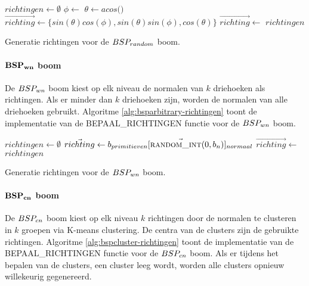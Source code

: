 \begin{dutchalgorithm}
    \begin{algorithmic}       
            \State $richtingen \gets \emptyset$
                    \State $\phi \gets $ 
                    \State $\theta \gets acos($$)$
                    \State $\vec{richting} \gets \{ sin(\theta)cos(\phi), sin(\theta)sin(\phi), cos(\theta) \}$
                    \State $\vec{richting} \gets $ 
                    \State {}
            \EndFor
            \State \Return $richtingen$
        \EndFunction
    \end{algorithmic}
    \caption{Generatie richtingen voor de $BSP_{random}$  boom.}
    \label{alg:bsprandom-richtingen}
\end{dutchalgorithm}

\paragraph{$\mathbf{BSP_{wn}}$ boom}
De $BSP_{wn}$ boom kiest op elk niveau de normalen van $k$ driehoeken als richtingen.
Als er minder dan $k$ driehoeken zijn, worden de normalen van alle driehoeken gebruikt.
Algoritme \ref{alg:bsparbitrary-richtingen} toont de implementatie van de BEPAAL\_RICHTINGEN functie voor de $BSP_{wn}$ boom.

\begin{dutchalgorithm}
    \begin{algorithmic}       
            \State $richtingen \gets \emptyset$
                    \State $\vec{richting} \gets \vec{b_{primitieven}[\Call{random\_int}{0, b_n}]_{normaal}}$
                    \State $\vec{richting} \gets $ 
                    \State {}
            \EndWhile
            \State \Return $richtingen$
        \EndFunction
    \end{algorithmic}
    \caption{Generatie richtingen voor de $BSP_{wn}$  boom.}
    \label{alg:bsparbitrary-richtingen}
\end{dutchalgorithm}

\paragraph{$\mathbf{BSP_{cn}}$ boom}
De $BSP_{cn}$ boom kiest op elk niveau $k$ richtingen door de normalen te clusteren in $k$ groepen via K-means clustering.
De centra van de clusters zijn de gebruikte richtingen.
Algoritme \ref{alg:bspcluster-richtingen} toont de implementatie van de BEPAAL\_RICHTINGEN functie voor de $BSP_{cn}$ boom.
Als er tijdens het bepalen van de clusters, een cluster leeg wordt, worden alle clusters opnieuw willekeurig gegenereerd.

